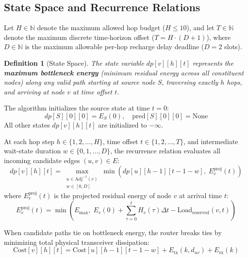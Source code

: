 \documentclass[journal]{IEEEtran}
\newtheorem{definition}{Definition}
\begin{document}
\subsection{State Space and Recurrence Relations}
Let $H \in \mathbb{N}$ denote the maximum allowed hop budget ($H \le 10$), and let $T \in \mathbb{N}$ denote the maximum discrete time-horizon offset ($T = H \cdot (D + 1)$), where $D \in \mathbb{N}$ is the maximum allowable per-hop recharge delay deadline ($D = 2$ slots).

\begin{definition}[State Space]
The state variable $dp[v][h][t]$ represents the \textbf{maximum bottleneck energy} (minimum residual energy across all constituent nodes) along any valid path starting at source node $S$, traversing exactly $h$ hops, and arriving at node $v$ at time offset $t$.
\end{definition}

The algorithm initializes the source state at time $t=0$:
\begin{equation}
dp[S][0][0] = E_S(0), \quad \text{pred}[S][0][0] = \text{None}
\end{equation}
All other states $dp[v][h][t]$ are initialized to $-\infty$.

At each hop step $h \in \{1, 2, \dots, H\}$, time offset $t \in \{1, 2, \dots, T\}$, and intermediate wait-state duration $w \in \{0, 1, \dots, D\}$, the recurrence relation evaluates all incoming candidate edges $(u, v) \in E$:
\begin{equation}
dp[v][h][t] = \max_{\substack{u \in \text{Adj}^{-1}(v) \\ w \in [0, D]}} \min \left( dp[u][h-1][t - 1 - w], \; E_v^{\text{proj}}(t) \right)
\label{eq:dp_recurrence}
\end{equation}
where $E_v^{\text{proj}}(t)$ is the projected residual energy of node $v$ at arrival time $t$:
\begin{equation}
E_v^{\text{proj}}(t) = \min \left( E_{\max}, \; E_v(0) + \sum_{\tau=0}^{t} H_v(\tau) \Delta t - \text{Load}_{\text{reserved}}(v, t) \right)
\label{eq:eproj}
\end{equation}

When candidate paths tie on bottleneck energy, the router breaks ties by minimizing total physical transceiver dissipation:
\begin{equation}
\text{Cost}[v][h][t] = \text{Cost}[u][h-1][t-1-w] + E_{\text{tx}}(k, d_{uv}) + E_{\text{rx}}(k)
\end{equation}
\end{document}
